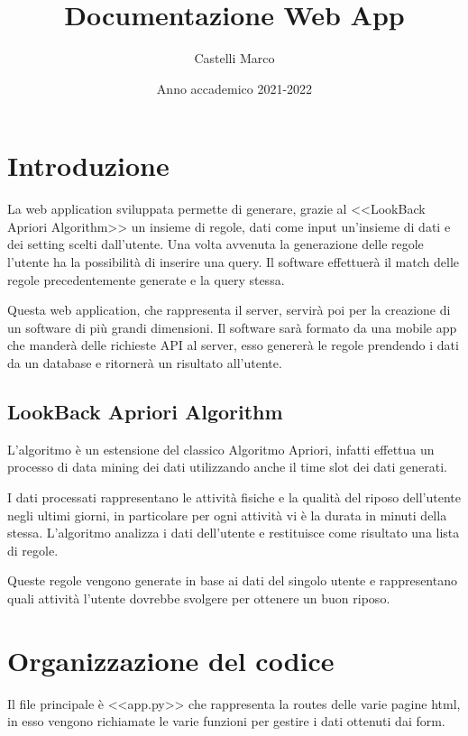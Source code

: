\documentclass[a4paper]{article}
\title{Documentazione  Web App}
\author{Castelli Marco}
\date{Anno accademico 2021-2022}
\begin{document}
\maketitle
\newpage


\tableofcontents

\newpage

\section{Introduzione}

La web application sviluppata permette di generare, grazie al <<LookBack Apriori Algorithm>> un insieme di regole, dati come input un'insieme di dati e dei setting scelti dall'utente. Una volta avvenuta la generazione delle regole l'utente ha la possibilità di inserire una query. Il software effettuerà il match delle regole precedentemente generate e la query stessa.

Questa web application, che rappresenta il server, servirà poi per la creazione di un software di più grandi dimensioni. Il software sarà formato da una mobile app  che manderà delle richieste API al server, esso genererà le regole prendendo i dati da un database e ritornerà un risultato all'utente.

\subsection{LookBack Apriori Algorithm}
L'algoritmo è un estensione del classico Algoritmo Apriori, infatti effettua un processo di data mining dei dati utilizzando anche il time slot dei dati generati.

 I dati processati  rappresentano le attività fisiche e la qualità del riposo dell'utente negli ultimi giorni, in particolare per ogni attività vi è la durata in minuti della stessa. L'algoritmo  analizza i dati dell'utente e restituisce come risultato una lista di regole. 

Queste regole vengono generate in base ai dati del singolo utente e rappresentano quali attività l'utente dovrebbe svolgere per ottenere un buon riposo.

\section{Organizzazione del codice}
Il file principale è <<app.py>> che rappresenta la routes delle varie pagine html, in esso vengono richiamate le varie funzioni per gestire i dati ottenuti dai form.
\end{document}

